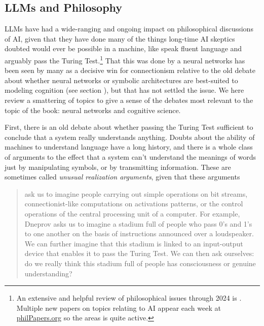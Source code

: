 \subsection{LLMs and Philosophy}\label{llmPhilosophy}

LLMs have had a wide-ranging and ongoing impact on philosophical discussions of
AI, given that they have done many of the things long-time AI skeptics doubted
would ever be possible in a machine, like speak fluent language and arguably
pass the Turing Test.\footnote{An extensive and helpful review of philosophical
issues through 2024 is \cite{milliere2024philosophical1,
milliere2024philosophical2}. Multiple new papers on topics relating to AI
appear each week at \url{philPapers.org} so the areas is quite active.} That
this was done by a neural networks has been seen by many as a decisive win for
connectionism relative to the old debate about whether neural networks or
symbolic architectures are best-suited to modeling cognition (see section
), but that has not settled the issue. We here review  a
smattering of topics to give a sense of the debates most relevant to the topic
of the book: neural networks and cognitive science.  


First, there is an old debate about whether passing the Turing Test sufficient
to conclude that a system really understands anything. Doubts about the ability
of machines to understand language have a long history, and there is a whole
class of arguments to the effect that a system can't understand the meanings of
words just by manipulating symbols, or by transmitting information. These are
sometimes called \emph{unusual realization arguments}, given that these
arguments
\begin{quote}
ask us to imagine people carrying out simple operations on bit streams,
connectionist-like computations on activations patterns, or the control
operations of the central processing unit of a computer. For example, Dneprov
asks us to imagine a stadium full of people who pass 0's and 1's to one another
on the basis of instructions announced over a loudspeaker. We can further
imagine that this stadium is linked to an input-output device that enables it
to pass the Turing Test. We can then ask ourselves: do we really think this
stadium full of people has consciousness or genuine understanding?
\cite{noelle2022artificial}
\end{quote}

